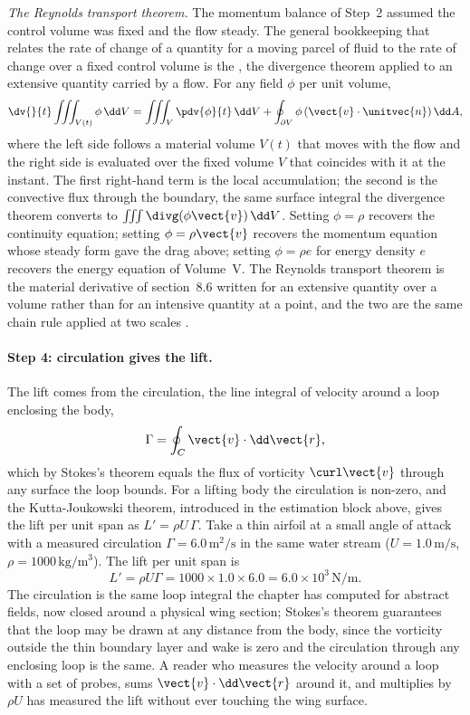 \begin{mastery}
\textit{The Reynolds transport theorem.} The momentum balance of
Step~2 assumed the control volume was fixed and the flow steady. The
general bookkeeping that relates the rate of change of a quantity for a
moving parcel of fluid to the rate of change over a fixed control
volume is the , the divergence
theorem applied to an extensive quantity carried by a flow. For any
field $\phi$ per unit volume,
\[
\dv{}{t}\iiint_{V(t)}\phi\,\dd V = \iiint_{V}\pdv{\phi}{t}\,\dd V +
\oint_{\partial V}\phi\,(\vect{v}\cdot\unitvec{n})\,\dd A,
\]
where the left side follows a material volume $V(t)$ that moves with
the flow and the right side is evaluated over the fixed volume $V$ that
coincides with it at the instant. The first right-hand term is the
local accumulation; the second is the convective flux through the
boundary, the same surface integral the divergence theorem converts to
$\iiint\divg(\phi\vect{v})\,\dd V$. Setting $\phi = \rho$ recovers the
continuity equation; setting $\phi = \rho\vect{v}$ recovers the
momentum equation whose steady form gave the drag above; setting
$\phi = \rho e$ for energy density $e$ recovers the energy equation of
Volume~V. The Reynolds transport theorem is the material derivative of
section~8.6 written for an extensive quantity over a volume rather than
for an intensive quantity at a point, and the two are the same chain
rule applied at two scales \cite{text:white-fluid-mechanics}.
\end{mastery}

\paragraph{Step 4: circulation gives the lift.} The lift comes from
the circulation, the line integral of velocity around a loop enclosing
the body,
\[
\Gamma = \oint_{C}\vect{v}\cdot\dd\vect{r},
\]
which by Stokes's theorem equals the flux of vorticity
$\curl\vect{v}$ through any surface the loop bounds. For a lifting
body the circulation is non-zero, and the Kutta-Joukowski theorem,
introduced in the estimation block above, gives the lift per unit
span as $L' = \rho U\,\Gamma$. Take a thin airfoil at a small angle
of attack with a measured circulation $\Gamma = 6.0\,\si{\meter
\squared\per\second}$ in the same water stream ($U = 1.0\,\si{\meter
\per\second}$, $\rho = 1000\,\si{\kilogram\per\meter\cubed}$). The
lift per unit span is
\[
L' = \rho U\Gamma = 1000\times 1.0\times 6.0 = 6.0\times 10^{3}\,
\si{\newton\per\meter}.
\]
The circulation is the same loop integral the chapter has computed for
abstract fields, now closed around a physical wing section; Stokes's
theorem guarantees that the loop may be drawn at any distance from the
body, since the vorticity outside the thin boundary layer and wake is
zero and the circulation through any enclosing loop is the same. A
reader who measures the velocity around a loop with a set of probes,
sums $\vect{v}\cdot\dd\vect{r}$ around it, and multiplies by $\rho U$
has measured the lift without ever touching the wing surface.

